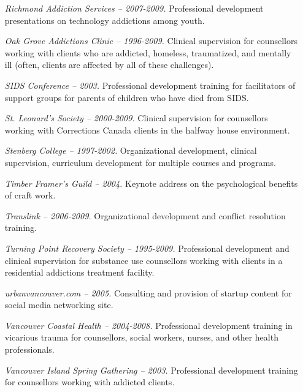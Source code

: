 \documentclass[10pt,DIV09,letterpaper,oneside,headsepline]{scrreprt}
\begin{document}
\begin{itemize}
\item [\textit{Richmond Addiction Services -- 2007-2009.}]
Professional development presentations on technology addictions among youth.

\item [\textit{Oak Grove Addictions Clinic -- 1996-2009.}]
Clinical supervision for counsellors working with clients who are addicted, homeless, traumatized, and mentally ill (often, clients are affected by all of these challenges).

\item [\textit{SIDS Conference -- 2003.}]
Professional development training for facilitators of support groups for parents of children who have died from SIDS.

\item [\textit{St. Leonard's Society -- 2000-2009.}]
Clinical supervision for counsellors working with Corrections Canada clients in the halfway house environment.

\item [\textit{Stenberg College -- 1997-2002.}]
Organizational development, clinical supervision, curriculum development for multiple courses and programs.

\item [\textit{Timber Framer's Guild -- 2004.}]
Keynote address on the psychological benefits of craft work.

\item [\textit{Translink -- 2006-2009.}]
Organizational development and conflict resolution training.

\item [\textit{Turning Point Recovery Society -- 1995-2009.}]
Professional development and clinical supervision for substance use counsellors working with clients in a residential addictions treatment facility.

\item [\textit{urbanvancouver.com -- 2005.}]
Consulting and provision of startup content for social media networking site. 

\item [\textit{Vancouver Coastal Health -- 2004-2008.}]
Professional development training in vicarious trauma for counsellors, social workers, nurses, and other health professionals.

\item [\textit{Vancouver Island Spring Gathering -- 2003.}]
Professional development training for counsellors working with addicted clients.


\end{itemize}
\end{document}
